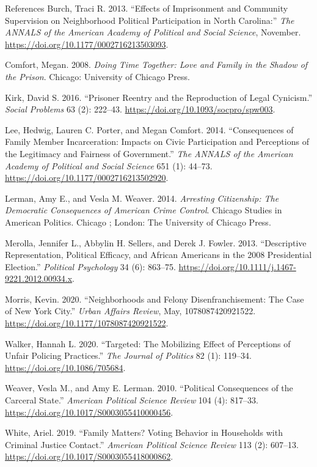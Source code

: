 \documentclass[
  ignorenonframetext,
  aspectratio=169]{beamer}
\newlength{\cslhangindent}
\newenvironment{cslreferences}%
  {\setlength{\parindent}{0pt}%
  \everypar{\setlength{\hangindent}{\cslhangindent}}\ignorespaces}%
  {\par}
\begin{document}
\begin{frame}{References}
\protect\hypertarget{references}{}
\hypertarget{refs}{}
\begin{cslreferences}
\leavevmode\hypertarget{ref-Burch2013}{}%
Burch, Traci R. 2013. ``Effects of Imprisonment and Community
Supervision on Neighborhood Political Participation in North Carolina:''
\emph{The ANNALS of the American Academy of Political and Social
Science}, November. \url{https://doi.org/10.1177/0002716213503093}.

\leavevmode\hypertarget{ref-Comfort2008}{}%
Comfort, Megan. 2008. \emph{Doing Time Together: Love and Family in the
Shadow of the Prison}. Chicago: University of Chicago Press.

\leavevmode\hypertarget{ref-Kirk2016}{}%
Kirk, David S. 2016. ``Prisoner Reentry and the Reproduction of Legal
Cynicism.'' \emph{Social Problems} 63 (2): 222--43.
\url{https://doi.org/10.1093/socpro/spw003}.

\leavevmode\hypertarget{ref-Lee2014}{}%
Lee, Hedwig, Lauren C. Porter, and Megan Comfort. 2014. ``Consequences
of Family Member Incarceration: Impacts on Civic Participation and
Perceptions of the Legitimacy and Fairness of Government.'' \emph{The
ANNALS of the American Academy of Political and Social Science} 651 (1):
44--73. \url{https://doi.org/10.1177/0002716213502920}.

\leavevmode\hypertarget{ref-Lerman2014}{}%
Lerman, Amy E., and Vesla M. Weaver. 2014. \emph{Arresting Citizenship:
The Democratic Consequences of American Crime Control}. Chicago Studies
in American Politics. Chicago ; London: The University of Chicago Press.

\leavevmode\hypertarget{ref-Merolla2013}{}%
Merolla, Jennifer L., Abbylin H. Sellers, and Derek J. Fowler. 2013.
``Descriptive Representation, Political Efficacy, and African Americans
in the 2008 Presidential Election.'' \emph{Political Psychology} 34 (6):
863--75. \url{https://doi.org/10.1111/j.1467-9221.2012.00934.x}.

\leavevmode\hypertarget{ref-Morris2020}{}%
Morris, Kevin. 2020. ``Neighborhoods and Felony Disenfranchisement: The
Case of New York City.'' \emph{Urban Affairs Review}, May,
1078087420921522. \url{https://doi.org/10.1177/1078087420921522}.

\leavevmode\hypertarget{ref-Walker2020}{}%
Walker, Hannah L. 2020. ``Targeted: The Mobilizing Effect of Perceptions
of Unfair Policing Practices.'' \emph{The Journal of Politics} 82 (1):
119--34. \url{https://doi.org/10.1086/705684}.

\leavevmode\hypertarget{ref-Weaver2010}{}%
Weaver, Vesla M., and Amy E. Lerman. 2010. ``Political Consequences of
the Carceral State.'' \emph{American Political Science Review} 104 (4):
817--33. \url{https://doi.org/10.1017/S0003055410000456}.

\leavevmode\hypertarget{ref-White2019a}{}%
White, Ariel. 2019. ``Family Matters? Voting Behavior in Households with
Criminal Justice Contact.'' \emph{American Political Science Review} 113
(2): 607--13. \url{https://doi.org/10.1017/S0003055418000862}.
\end{cslreferences}
\end{frame}
\end{document}
